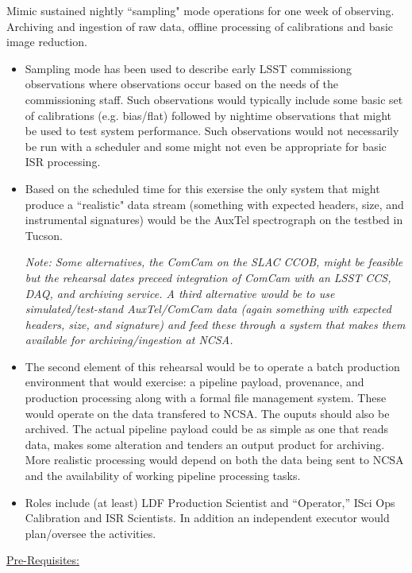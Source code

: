 Mimic sustained nightly ``sampling" mode operations for one week of 
observing.  Archiving and ingestion of raw data, offline processing of 
calibrations and basic image reduction.
\begin{itemize}
\item Sampling mode has been used to describe early LSST commissiong observations where
observations occur based on the needs of the commissioning staff.  Such observations would
typically include some basic set of calibrations (e.g. bias/flat) followed by nightime observations
that might be used to test system performance.  Such observations would not necessarily be run with 
a scheduler and some might not even be appropriate for basic ISR processing.

\item Based on the scheduled time for this exersise the only system that
might produce a ``realistic" data stream (something with expected headers, size, 
and instrumental signatures) would be the AuxTel spectrograph on the testbed in Tucson.

{\it Note: Some alternatives, the ComCam on the SLAC CCOB, might be feasible but the rehearsal dates 
preceed integration of ComCam with an LSST CCS, DAQ, and archiving service.  A third 
alternative would be to use simulated/test-stand AuxTel/ComCam data (again something 
with expected headers, size, and signature) and feed these through a system that makes them 
available for archiving/ingestion at NCSA.}

\item The second element of this rehearsal would be to operate a batch production environment
that would exercise: a pipeline payload, provenance, and production processing along with a 
formal file management system.  These would operate on the data transfered to NCSA.  The ouputs should 
also be archived.  The actual pipeline payload could be as simple as one that reads data, makes
some alteration and tenders an output product for archiving.  More realistic processing would 
depend on both the data being sent to NCSA and the availability of working pipeline processing tasks.

\item Roles include (at least) LDF Production Scientist and “Operator,” 
ISci Ops Calibration and ISR Scientists.  In addition an independent executor
would plan/oversee the activities.
\end{itemize}

\clearpage

\underline{Pre-Requisites:}

